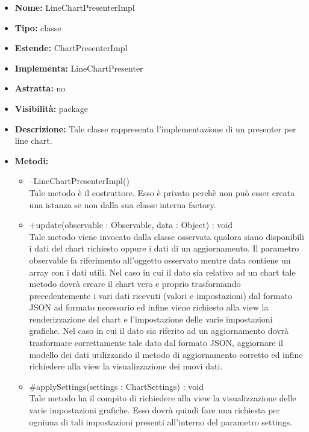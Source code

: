 			
			\begin{itemize}
			\item \textbf{Nome:} LineChartPresenterImpl
			\item \textbf{Tipo:} classe
			
		\item \textbf{Estende:}
		ChartPresenterImpl
		\item \textbf{Implementa:}
		LineChartPresenter
		\item \textbf{Astratta:}
		no
			\item \textbf{Visibilità:} package
			\item \textbf{Descrizione:} Tale classe rappresenta l'implementazione di un presenter per line chart.
			\item \textbf{Metodi:}
				\begin{itemize}
				\setlength{\itemsep}{5pt}
				
					\item[\ding{111}] {{--LineChartPresenterImpl()}} \\ [1mm] Tale metodo è il costruttore. Esso è privato perchè non può esser creata una istanza se non dalla sua classe interna factory.
					\item[\ding{111}] {{+update(observable : Observable, data : Object) : void}} \\ [1mm] Tale metodo viene invocato dalla classe osservata qualora siano disponibili i dati del chart richiesto oppure i dati di un aggiornamento. Il parametro observable fa riferimento all'oggetto osservato mentre data contiene un array con i dati utili. Nel caso in cui il dato sia relativo ad un chart tale metodo dovrà creare il chart vero e proprio trasformando precedentemente i vari dati ricevuti (valori e impostazioni) dal formato JSON ad formato necessario ed infine viene richiesto alla view la renderizzazione del chart e l'impostazione delle varie impostazioni grafiche. Nel caso in cui il dato sia riferito ad un aggiornamento dovrà trasformare correttamente tale dato dal formato JSON, aggiornare il modello dei dati utilizzando il metodo di aggiornamento corretto ed infine richiedere alla view la visualizzazione dei nuovi dati.
					\item[\ding{111}] {{\#applySettings(settings : ChartSettings) : void}} \\ [1mm] Tale metodo ha il compito di richiedere alla view la visualizzazione delle varie impostazioni grafiche. Esso dovrà quindi fare una richiesta per ogniuna di tali impostazioni presenti all'interno del parametro settings.
				\end{itemize}
		
			\end{itemize}

